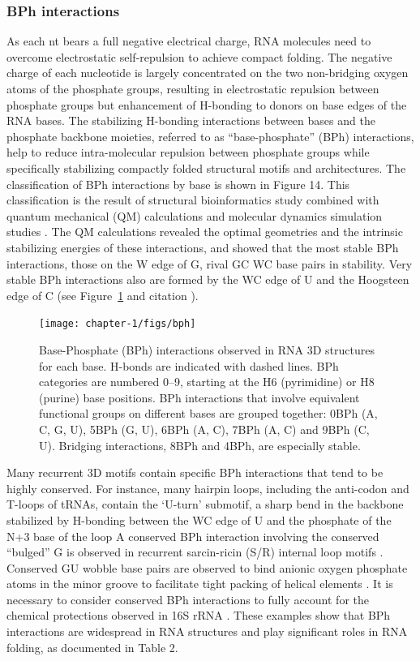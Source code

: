 \subsubsection{BPh interactions}

As each nt bears a full negative electrical charge, RNA molecules need to
overcome electrostatic self-repulsion to achieve compact folding. The negative
charge of each nucleotide is largely concentrated on the two non-bridging oxygen
atoms of the phosphate groups, resulting in electrostatic repulsion between
phosphate groups but enhancement of H-bonding to donors on base edges of the RNA
bases.  The stabilizing H-bonding interactions between bases and the phosphate
backbone moieties, referred to as ``base-phosphate'' (BPh) interactions, help to
reduce intra-molecular repulsion between phosphate groups while specifically
stabilizing compactly folded structural motifs and architectures. The
classification of BPh interactions by base is shown in Figure 14. This
classification is the result of structural bioinformatics study combined with
quantum mechanical (QM) calculations and molecular dynamics simulation studies
\cite{Zirbel2009, Zgarbova2011a}. The QM calculations revealed the optimal
geometries and the intrinsic stabilizing energies of these interactions, and
showed that the most stable BPh interactions, those on the W edge of G, rival GC
WC base pairs in stability. Very stable BPh interactions also are formed by the
WC edge of U and the Hoogsteen edge of C (see Figure~\ref{fig:bph} and citation
\cite{Zirbel2009}).

\begin{figure}
  \texttt{[image: chapter-1/figs/bph]}
  \caption{Base-Phosphate (BPh) interactions observed in RNA 3D structures for
    each base. H-bonds are indicated with dashed lines. BPh categories are
    numbered 0–9, starting at the H6 (pyrimidine) or H8 (purine) base positions.
    BPh interactions that involve equivalent functional groups on different
    bases are grouped together: 0BPh (A, C, G, U), 5BPh (G, U), 6BPh (A, C),
    7BPh (A, C) and 9BPh (C, U). Bridging interactions, 8BPh and 4BPh, are
  especially stable.}
  \label{fig:bph}
\end{figure}

Many recurrent 3D motifs contain specific BPh interactions that tend to be
highly conserved. For instance, many hairpin loops, including the anti-codon and
T-loops of tRNAs, contain the ‘U-turn' submotif, a sharp bend in the backbone
stabilized by H-bonding between the WC edge of U and the phosphate of the N+3
base of the loop \cite{Quigley1976} A conserved BPh interaction involving the
conserved ``bulged'' G is observed in recurrent sarcin-ricin (S/R) internal loop
motifs \cite{Correll1998}. Conserved GU wobble base pairs are observed to bind
anionic oxygen phosphate atoms in the minor groove to facilitate tight packing
of helical elements \cite{Mokdad2006b}. It is necessary to consider conserved
BPh interactions to fully account for the chemical protections observed in 16S
rRNA \cite{Merryman1999, Stern1988}. These examples show that BPh interactions
are widespread in RNA structures and play significant roles in RNA folding, as
documented in Table 2.

